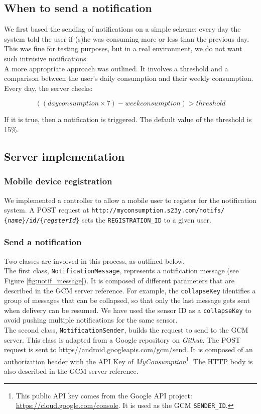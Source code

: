 \documentclass[a4paper, oneside, 11pt]{book}
\begin{document}
\subsection{When to send a notification}
We first based the sending of notifications on a simple scheme: every day the system told the user if (s)he was consuming more or less than the previous day. This was fine for testing purposes, but in a real environment, we do not want such intrusive notifications. \\

A more appropriate approach was outlined. It involves a threshold and a comparison between the user’s daily consumption and their weekly consumption. Every day, the server checks: 

\[((dayconsumption \times 7) - weekconsumption) > threshold\]

If it is true, then a notification is triggered. The default value of the threshold is 15\%.

\subsection{Server implementation}
\subsubsection{Mobile device registration}
We implemented a controller to allow a mobile user to register for the notification system. A POST request at \texttt{http://myconsumption.s23y.com/notifs/ \{\textit{name}\}/id/\{\textit{regsterId}\}} sets the \texttt{REGISTRATION\_ID} to a given user.
\subsubsection{Send a notification}
Two classes are involved in this process, as outlined below.\\ 

The first class, \texttt{NotificationMessage}, represents a notification message (see Figure \ref{fig:notif_message}). It is composed of different parameters that are described in the GCM server reference. For example, the \texttt{collapseKey} identifies a group of messages that can be collapsed, so that only the last message gets sent when delivery can be resumed. We have used the sensor ID as a \texttt{collapseKey} to avoid pushing multiple notifications for the same sensor.\\

The second class, \texttt{NotificationSender}, builds the request to send to the GCM server. This class is adapted from a Google repository on \textit{Github}. The POST request is sent to https//android.googleapis.com/gcm/send. It is composed of an authorization header with the API Key of \textit{MyConsumption}\footnote{This public API key comes from the Google API project: \url{https://cloud.google.com/console}. It is used as the GCM \texttt{SENDER\_ID}.}. The HTTP body is also described in the GCM server reference.
\end{document}
